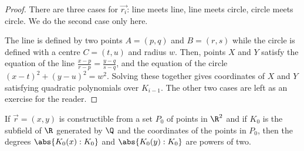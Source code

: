 \documentclass{article}
\begin{document}
\begin{proof}
    There are three cases for $\vec{r_i}$: line meets line, line meets circle, circle meets circle. We do the second case only here.
    \begin{center}
    \end{center}
    The line is defined by two points $A = (p, q)$ and $B = (r, s)$ while the circle is defined with a centre $C = (t, u)$ and radius $w$.
    Then, points $X$ and $Y$ satisfy the equation of the line $\frac{x-p}{r-p} = \frac{y-q}{s-q}$, and the equation of the circle $(x-t)^2 + (y-u)^2 = w^2$.
    Solving these together gives coordinates of $X$ and $Y$ satisfying quadratic polynomials over $K_{i-1}$.
    The other two cases are left as an exercise for the reader.
\end{proof}


\begin{nthm}\label{thm:1.14}
    If $\vec{r} = (x, y)$ is constructible from a set $P_0$ of points in $\R^2$ and if $K_0$ is the subfield of $\R$ generated by $\Q$ and the coordinates of the points in $P_0$, then the degrees $\abs{K_0(x) : K_0}$ and $\abs{K_0(y):K_0}$ are powers of two.
\end{nthm}
\end{document}
